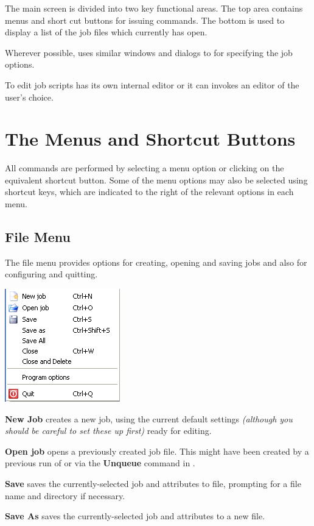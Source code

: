 The main screen is divided into two key functional areas. The top area
contains menus and short cut buttons for issuing commands. The bottom
is used to display a list of the job files which  currently
has open.

Wherever possible,
 uses similar windows and dialogs to  for specifying the job options.

To edit job scripts  has its own internal editor or it can invokes an editor of the
user's choice.

\section{The Menus and Shortcut Buttons}
All commands are performed by selecting a menu option or clicking on the
equivalent shortcut button. Some of the menu options may also be
selected using shortcut keys, which are indicated to the right of the
relevant options in each menu.

\subsection{File Menu}
The file menu provides options for creating, opening and saving jobs and also for configuring  and quitting.

\includegraphics{img/btrwfilemenu.png}

\textbf{New Job} creates a new job, using the current default settings \textit{(although you should
be careful to set these up first)} ready for editing.

\textbf{Open job} opens a previously created job file. This might have been created by a previous run of 
or via the \textbf{Unqueue} command in .

\textbf{Save} saves the currently-selected job and attributes to file, prompting for a file name and directory
if necessary.

\textbf{Save As} saves the currently-selected job and attributes to a new file.

